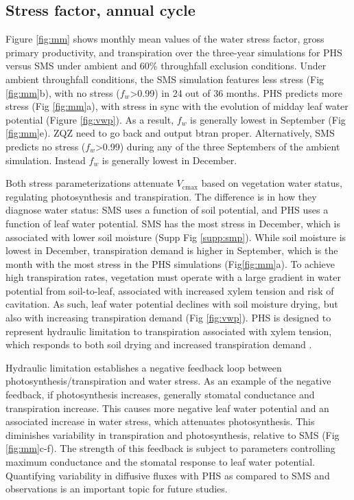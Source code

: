 \documentclass[draft,linenumbers]{agujournal}
\begin{document}
\subsection{Stress factor, annual cycle}

Figure \ref{fig:mm} shows monthly mean values of the water stress factor, gross primary productivity, and transpiration
over the three-year simulations for PHS versus SMS under ambient and 60\% throughfall exclusion conditions.
Under ambient throughfall conditions, the SMS simulation features less stress (Fig \ref{fig:mm}b), with
no stress ($f_w$>0.99) in 24 out of 36 months.
PHS predicts more stress (Fig \ref{fig:mm}a), with stress in sync with the evolution of midday leaf water potential (Figure \ref{fig:vwp}).
As a result, $f_w$ is generally lowest in September (Fig \ref{fig:mm}e). ZQZ need to go back and output btran proper.
Alternatively, SMS predicts no stress ($f_w$>0.99) during any of the three Septembers of the ambient simulation.
Instead $f_w$ is generally lowest in December.

Both stress parameterizations attenuate $V_{\text{cmax}}$ based on vegetation water status, regulating photosynthesis and transpiration.
The difference is in how they diagnose water status: SMS uses a function of soil potential, and PHS uses a function of leaf water potential.
SMS has the most stress in December, which is associated with lower soil moisture (Supp Fig \ref{supp:smp}).
While soil moisture is lowest in December, transpiration demand is higher in September,
which is the month with the most stress in the PHS simulations (Fig\ref{fig:mm}a).
To achieve high transpiration rates, vegetation must operate with a large gradient in water potential from soil-to-leaf, associated with increased xylem tension and risk of cavitation.
As such, leaf water potential declines with soil moisture drying, but also with increasing transpiration demand (Fig \ref{fig:vwp}).
PHS is designed to represent hydraulic limitation to transpiration associated with xylem tension, which responds to both soil drying and increased transpiration demand \citep{sperry2015}.

Hydraulic limitation establishes a negative feedback loop between photosynthesis/transpiration and water stress.
As an example of the negative feedback, if photosynthesis increases, generally stomatal conductance and transpiration increase.
This causes more negative leaf water potential and an associated increase in water stress, which attenuates photosynthesis.
This diminishes variability in transpiration and photosynthesis, relative to SMS (Fig \ref{fig:mm}c-f).
The strength of this feedback is subject to parameters controlling maximum conductance and the stomatal response to leaf water potential.
Quantifying variability in diffusive fluxes with PHS as compared to SMS and observations is an important topic for future studies.
\end{document}
